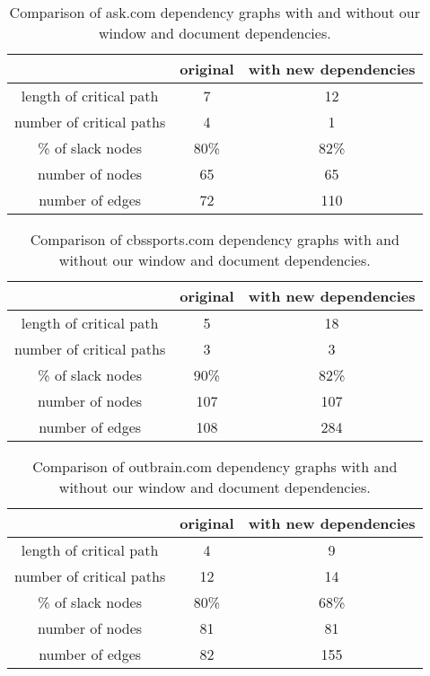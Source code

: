 \begin{table*}[tb]
\centering
\small
\begin{tabular}{|c|c|c|}
\hline
 & original & with new dependencies \\
\hline
length of critical path & 7 & 12 \\
number of critical paths & 4 & 1 \\
\% of slack nodes & 80\% & 82\% \\
number of nodes & 65 & 65 \\
number of edges & 72 & 110 \\
\hline
\end{tabular}\caption{Comparison of ask.com dependency graphs with and without our window and document dependencies.}
\label{t:askgraph}
\end{table*}

\begin{table*}[tb]
\centering
\small
\begin{tabular}{|c|c|c|}
\hline
 & original & with new dependencies \\
\hline
length of critical path & 5 & 18 \\
number of critical paths & 3 & 3 \\
\% of slack nodes & 90\% & 82\% \\
number of nodes & 107 & 107 \\
number of edges & 108 & 284 \\
\hline
\end{tabular}\caption{Comparison of cbssports.com dependency graphs with and without our window and document dependencies.}
\label{t:cbssportsgraph}
\end{table*}

\begin{table*}[tb]
\centering
\small
\begin{tabular}{|c|c|c|}
\hline
 & original & with new dependencies \\
\hline
length of critical path & 4 & 9 \\
number of critical paths & 12 & 14 \\
\% of slack nodes & 80\% & 68\% \\
number of nodes & 81 & 81 \\
number of edges & 82 & 155 \\
\hline
\end{tabular}\caption{Comparison of outbrain.com dependency graphs with and without our window and document dependencies.}
\label{t:outbraingraph}
\end{table*}


